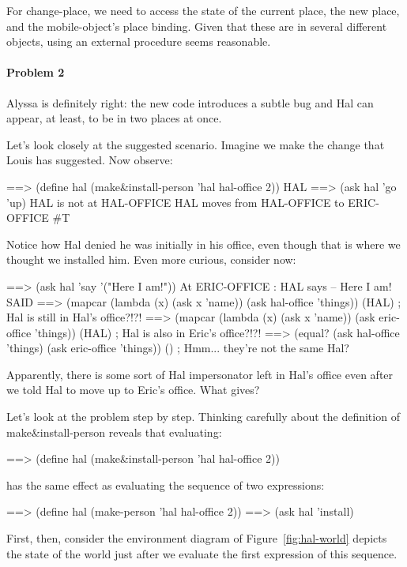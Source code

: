 For {\cf change-place}, we need to access the state of the current
place, the new place, and the {\cf mobile-object}'s place binding.
Given that these are in several different objects, using an external
procedure seems reasonable.

\paragraph{Problem 2}

Alyssa is definitely right: the new code introduces a subtle bug and {\cf
Hal} can appear, at least, to be in two places at once.

Let's look closely at the suggested scenario. Imagine we make the change that
Louis has suggested. Now observe:

\beginlisp
==> (define hal (make\&install-person 'hal hal-office 2))
HAL
\null
==> (ask hal 'go 'up)
HAL is not at HAL-OFFICE
HAL moves from HAL-OFFICE to ERIC-OFFICE
\#T
\endlisp

Notice how Hal denied he was initially in his office, even though that is where
we thought we installed him. Even more curious, consider now:

\beginlisp
==> (ask hal 'say '("Here I am!"))
At ERIC-OFFICE : HAL says -- Here I am!
SAID
\null
==> (mapcar (lambda (x) (ask x 'name))
            (ask hal-office 'things))
(HAL)  ; Hal is still in Hal's office?!?!
\null
==> (mapcar (lambda (x) (ask x 'name))
            (ask eric-office 'things))
(HAL)  ; Hal is also in Eric's office?!?!
\null
==> (equal? (ask  hal-office 'things)
            (ask eric-office 'things))
()     ; Hmm... they're not the same Hal?
\endlisp

Apparently, there is some sort of Hal impersonator left in Hal's office even
after we told Hal to move up to Eric's office. What gives?

Let's look at the problem step by step. Thinking carefully about the definition
of {\cf make\&install-person} reveals that evaluating:

\beginlisp
==> (define hal (make\&install-person 'hal hal-office 2))
\endlisp

has the same effect as evaluating the sequence of two expressions:

\beginlisp
==> (define hal (make-person 'hal hal-office 2))
==> (ask hal 'install)
\endlisp

First, then, consider the environment diagram of Figure~\ref{fig:hal-world}
depicts the state
of the world just after we evaluate the first expression of this sequence.


